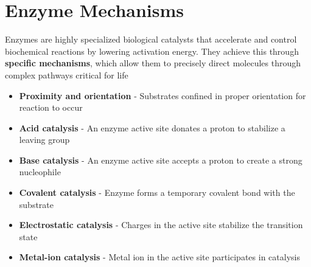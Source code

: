 \documentclass[10pt]{article}
\begin{document}
\section*{Enzyme Mechanisms}
Enzymes are highly specialized biological catalysts that accelerate and control biochemical reactions by lowering activation energy.  They achieve this through \textbf{specific mechanisms}, which allow them to precisely direct molecules through complex pathways critical for life
\begin{itemize}
    \item \textbf{Proximity and orientation} - Substrates confined in proper orientation for reaction to occur
    \item \textbf{Acid catalysis} - An enzyme active site donates a proton to stabilize a leaving group
    \item \textbf{Base catalysis} - An enzyme active site accepts a proton to create a strong nucleophile
    \item \textbf{Covalent catalysis} - Enzyme forms a temporary covalent bond with the substrate
    \item \textbf{Electrostatic catalysis} - Charges in the active site stabilize the transition state
    \item \textbf{Metal-ion catalysis} - Metal ion in the active site participates in catalysis
\end{itemize}
\end{document}
